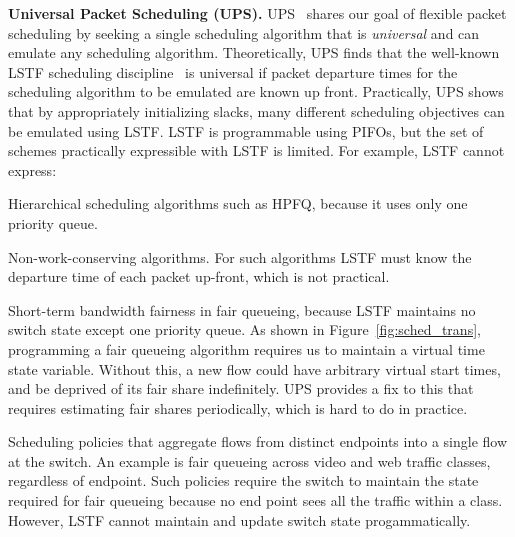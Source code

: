 \medskip
\noindent
\textbf{Universal Packet Scheduling (UPS).} UPS~\cite{ups} shares our goal of
flexible packet scheduling by seeking a single scheduling algorithm that is
{\em universal} and can emulate any scheduling algorithm. Theoretically, UPS
finds that the well-known LSTF scheduling discipline~\cite{lstf} is universal
if packet departure times for the scheduling algorithm to be emulated are known
up front. Practically, UPS shows that by appropriately initializing slacks, many different scheduling objectives can be
emulated using LSTF. LSTF is programmable using PIFOs, but the set of schemes
practically expressible with LSTF is limited. For example, LSTF cannot
express:
\begin{CompactEnumerate}
\item Hierarchical scheduling algorithms such as HPFQ, because it
  uses only one priority queue.
\item Non-work-conserving algorithms. For such algorithms LSTF must know the
  departure time of each packet up-front, which is not practical.
\item Short-term bandwidth fairness in fair queueing, because LSTF maintains no
  switch state except one priority queue. As shown in
  Figure~\ref{fig:sched_trans}, programming a fair queueing algorithm requires us
  to maintain a virtual time state variable. Without this, a new flow could have
  arbitrary virtual start times, and be deprived of its fair share indefinitely.
  UPS provides a fix to this that requires
  estimating fair shares periodically, which is hard to do in
  practice.
\item Scheduling policies that aggregate flows from distinct endpoints into a
  single flow at the switch. An example is fair queueing across video and web
  traffic classes, regardless of endpoint.  Such policies require the switch to
  maintain the state required for fair queueing because no end point sees all the
  traffic within a class.  However, LSTF cannot maintain and update switch state
  progammatically.
\end{CompactEnumerate}


